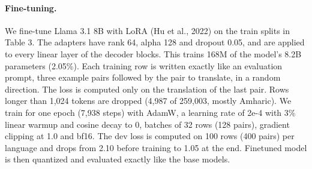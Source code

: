 \documentclass[11pt]{article}
\begin{document}
\begin{table}[htbp]
\centering
\small
{}
\caption{Data per language. Fine-tune train gives the corpora and the number of pairs after cleaning, decontamination and the 100,000-pair cap. Fine-tune dev is the corpus of the 400 dev pairs used to track the fine-tuning loss.}
\end{table}

\paragraph{Fine-tuning.} We fine-tune Llama 3.1 8B with LoRA (Hu et al., 2022) on the train splits in Table 3. The adapters have rank 64, alpha 128 and dropout 0.05, and are applied to every linear layer of the decoder blocks. This trains 168M of the model's 8.2B parameters (2.05\%). Each training row is written exactly like an evaluation prompt, three example pairs followed by the pair to translate, in a random direction. The loss is computed only on the translation of the last pair. Rows longer than 1,024 tokens are dropped (4,987 of 259,003, mostly Amharic). We train for one epoch (7,938 steps) with AdamW, a learning rate of 2e-4 with 3\% linear warmup and cosine decay to 0, batches of 32 rows (128 pairs), gradient clipping at 1.0 and bf16. The dev loss is computed on 100 rows (400 pairs) per language and drops from 2.10 before training to 1.05 at the end. Finetuned model is then quantized and evaluated exactly like the base models.
\end{document}

